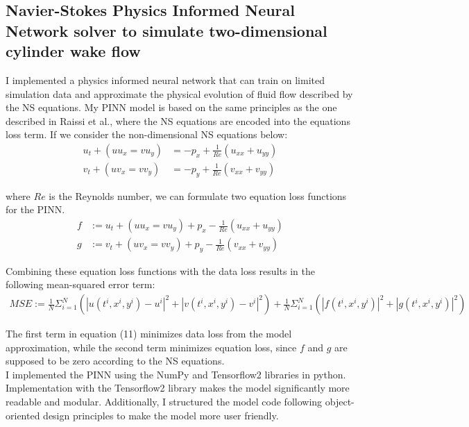 \subsection{Navier-Stokes Physics Informed Neural Network solver to simulate two-dimensional cylinder wake flow}

I implemented a physics informed neural network that can train on limited simulation data and approximate the physical evolution of fluid flow described by the NS equations. My PINN model is based on the same principles as the one described in Raissi et al.\cite{Raissi2019}, where the NS equations are encoded into the equations loss term. If we consider the non-dimensional NS equations below:
\begin{align}
    u_{t} + (uu_{x} = vu_{y}) &= -p_{x} + \frac{1}{Re} (u_{xx} + u_{yy}) \\
    v_{t} + (uv_{x} = vv_{y}) &= -p_{y} + \frac{1}{Re} (v_{xx} + v_{yy})
\end{align} 

\noindent where $Re$ is the Reynolds number, we can formulate two equation loss functions for the PINN.
\begin{align}
    f &:= u_{t} + (uu_{x} = vu_{y}) + p_{x} - \frac{1}{Re} (u_{xx} + u_{yy}) \\
    g &:= v_{t} + (uv_{x} = vv_{y}) +p_{y} - \frac{1}{Re} (v_{xx} + v_{yy})
\end{align} 

\noindent Combining these equation loss functions with the data loss results in the following mean-squared error term:
\begin{align}
    MSE := \frac{1}{N} \Sigma^{N}_{i = 1} (|u(t^{i}, x^{i}, y^{i}) - u^{i}|^2 +  |v(t^{i}, x^{i}, y^{i}) - v^{i}|^2) + \frac{1}{N} \Sigma^{N}_{i = 1} (|f(t^{i}, x^{i}, y^{i})|^2 + |g(t^{i}, x^{i}, y^{i})|^2)
\end{align}

\noindent The first term in equation (11) minimizes data loss from the model approximation, while the second term minimizes equation loss, since $f$ and $g$ are supposed to be zero according to the NS equations.\\

I implemented the PINN using the NumPy and Tensorflow2 libraries in python. Implementation with the Tensorflow2 library makes the model significantly more readable and modular. Additionally,  I structured the model code following object-oriented design principles to make the model more user friendly.

